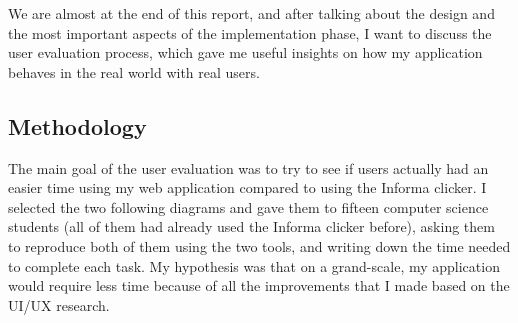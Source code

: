 \documentclass[]{usiinfbachelorproject}
\begin{document}
We are almost at the end of this report, and after talking about the design and the most important aspects of the implementation phase, I want to discuss the user evaluation process, which gave me useful insights on how my application behaves in the real world with real users.

\subsection{Methodology}

The main goal of the user evaluation was to try to see if users actually had an easier time using my web application compared to using the Informa clicker. I selected the two following diagrams and gave them to fifteen computer science students (all of them had already used the Informa clicker before), asking them to reproduce both of them using the two tools, and writing down the time needed to complete each task. My hypothesis was that on a grand-scale, my application would require less time because of all the improvements that I made based on the UI/UX research.
\end{document}
